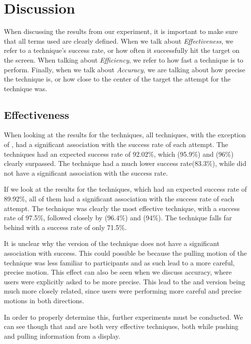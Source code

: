 \section{Discussion}\label{sec:discussion}
When discussing the results from our experiment, it is important to make sure that all terms used are clearly defined. When we talk about \emph{Effectiveness}, we refer to a technique's success rate, or how often it successfully hit the target on the screen. When talking about \emph{Efficiency}, we refer to how fast a technique is to perform. Finally, when we talk about \emph{Accuracy}, we are talking about how precise the technique is, or how close to the center of the target the attempt for the technique was. 

\subsection{Effectiveness}

When looking at the results for the \push techniques, all techniques, with the exception of \throw, had a significant association with the success rate of each attempt.
The \push techniques had an expected success rate of 92.02\%, which \grab (95.9\%) and \swipe (96\%) clearly surpassed.
The \tilt technique had a much lower success rate(83.3\%), while \throw did not have a significant association with the success rate.

If we look at the results for the \pull techniques, which had an expected success rate of 89.92\%, all of them had a significant association with the success rate of each attempt.  
The \swipe technique was clearly the most effective technique, with a success rate of 97.5\%, followed closely by \throw (96.4\%) and \grab (94\%). 
The \tilt technique falls far behind with a success rate of only 71.5\%. 

It is unclear why the \push version of the \throw technique does not have a significant association with success.
This could possible be because the pulling motion of the \throw technique was less familiar to participants and as such lead to a more careful, precise motion.
This effect can also be seen when we discuss accuracy, where users were explicitly asked to be more precise.
This lead to the \push and \pull version being much more closely related, since users were performing more careful and precise motions in both directions. 

In order to properly determine this, further experiments must be conducted.
We can see though that \swipe and \grab are both very effective techniques, both while pushing and pulling information from a display.



